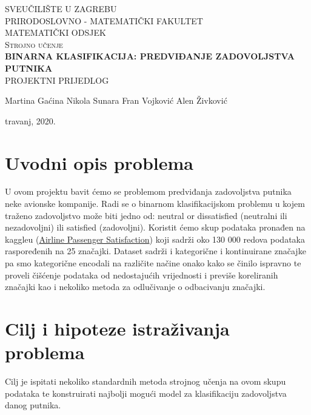 \documentclass[a4paper,12pt]{article}
\begin{document}
\begin{titlepage}
\begin{center}

\textsc{\large {SVEU\v{C}ILI\v{S}TE U ZAGREBU\\ PRIRODOSLOVNO - MATEMATIČKI FAKULTET\\  MATEMATIČKI ODSJEK}}\\[6.0cm]


\textsc{\Large {Strojno učenje}}\\[0.5cm]
\textsc{\huge\bfseries \Large BINARNA KLASIFIKACIJA: PREDVIĐANJE ZADOVOLJSTVA PUTNIKA} \\[1.0cm]
\textsc{\Large {PROJEKTNI PRIJEDLOG}}\\[0.5cm]

\vfill


\noindent
\begin{minipage}[t]{25cm}
\large{Martina Gaćina}\newline
\large{Nikola Sunara}\newline
\large{Fran Vojković}\newline
\large{Alen Živković}\newline
\end{minipage}

\large{travanj, 2020.}
\end{center}
\end{titlepage}

\section{Uvodni opis problema}
U ovom projektu bavit ćemo se problemom predviđanja zadovoljstva putnika neke avionske kompanije. Radi se o binarnom klasifikacijskom problemu u kojem traženo zadovoljstvo može biti jedno od: neutral or dissatisfied (neutralni ili nezadovoljni) ili satisfied (zadovoljni). Koristit ćemo skup podataka pronađen na kaggleu (\href{https://www.kaggle.com/teejmahal20/airline-passenger-satisfaction}{Airline Passenger Satisfaction}) koji sadrži oko 130 000 redova podataka raspoređenih na 25 značajki. Dataset sadrži i kategorične i kontinuirane značajke pa smo kategorične encodali na različite načine onako kako se činilo ispravno te proveli čišćenje podataka od nedostajućih vrijednosti i previše koreliranih značajki kao i nekoliko metoda za odlučivanje o odbacivanju značajki.

\section{Cilj i hipoteze istraživanja problema}
Cilj je ispitati nekoliko standardnih metoda strojnog učenja na ovom skupu podataka te konstruirati najbolji mogući model za klasifikaciju zadovoljstva danog putnika.
\newline
\end{document}
